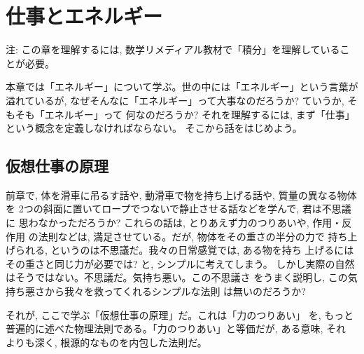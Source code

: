 \chapter{仕事とエネルギー}

{\small 注: この章を理解するには, 数学リメディアル教材で「積分」を理解していることが必要。}

本章では「エネルギー」について学ぶ。世の中には「エネルギー」という言葉が溢れているが, 
なぜそんなに「エネルギー」って大事なのだろうか? ていうか, そもそも「エネルギー」って
何なのだろうか? それを理解するには, まず「仕事」という概念を定義しなければならない。
そこから話をはじめよう。\\

\section{仮想仕事の原理}

前章で, 体を滑車に吊るす話や, 動滑車で物を持ち上げる話や, 質量の異なる物体を
2つの斜面に置いてロープでつないで静止させる話などを学んで, 君は不思議に
思わなかっただろうか? これらの話は, とりあえず力のつりあいや, 作用・反作用
の法則などは, 満足させている。だが, 物体をその重さの半分の力で
持ち上げられる, というのは不思議だ。我々の日常感覚では, ある物を持ち
上げるにはその重さと同じ力が必要では? と, シンプルに考えてしまう。
しかし実際の自然はそうではない。不思議だ。気持ち悪い。この不思議さ
をうまく説明し, この気持ち悪さから我々を救ってくれるシンプルな法則
は無いのだろうか? 

それが, ここで学ぶ「仮想仕事の原理」だ。これは「力のつりあい」
を, もっと普遍的に述べた物理法則である。「力のつりあい」と等価だが, ある意味, それ
よりも深く, 根源的なものを内包した法則だ。

